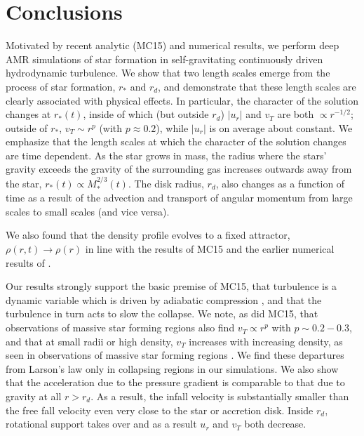 \documentclass[../dissertation.tex]{subfiles}
\begin{document}
\section{Conclusions}
\label{sec:hydro_conclusions}

Motivated by recent analytic (MC15) and numerical 
\citep{2014ApJ...797...32P,2015ApJ...800...49L} results, we perform deep AMR simulations 
of star formation in self-gravitating continuously driven hydrodynamic turbulence. We show 
that two length scales emerge from the process of star formation, $r_*$ and $r_d$, and demonstrate
that these length scales are clearly associated with physical effects. 
In particular, the character of the 
solution changes at $r_*(t)$, inside of which (but outside $r_d$) $|u_r|$ and  $v_T$ are both
$\propto r^{-1/2}$; outside of $r_*$, $v_T\sim r^{p}$ (with $p\approx0.2$), while $|u_r|$ 
is on average about constant. 
We emphasize that the length scales at which the character of the solution changes are time dependent. 
As the star grows in mass, the radius where the stars' gravity exceeds the gravity of the surrounding gas increases outwards away from the star, 
$r_*(t) \propto M_*^{2/3}(t)$.
The disk radius, $r_d$, also changes as a function of time as a result of the advection and transport of angular momentum from large scales to small scales (and vice versa).

We also found that the density profile evolves
to a fixed attractor, $\rho(r,t ) \rightarrow \rho(r)$ in line with the results of MC15 and 
the earlier numerical results of \citet{2015ApJ...800...49L}. 

Our results strongly support the basic premise of MC15, that turbulence is a dynamic variable 
which is driven by adiabatic compression \citep{2012ApJ...750L..31R}, and that the turbulence
in turn acts to slow the collapse. 
We note, as did MC15, that observations of massive star forming regions also find $v_T \propto r^p$ 
with $ p \sim 0.2-0.3$, and that at small radii or high density, $v_T$  
increases with increasing density, as seen in observations of massive star forming
regions \citep{1997ApJ...476..730P}. We find these departures from Larson's law only in
collapsing regions in our simulations. We also show that the acceleration 
due to the pressure gradient is comparable to that due to gravity at all $r>r_d$. 
As a result, the infall velocity is substantially smaller than the free fall velocity
even very close to the star or accretion disk. Inside $r_d$, rotational support takes over 
and as a result $u_r$ and $v_T$ both decrease.  
\end{document}
